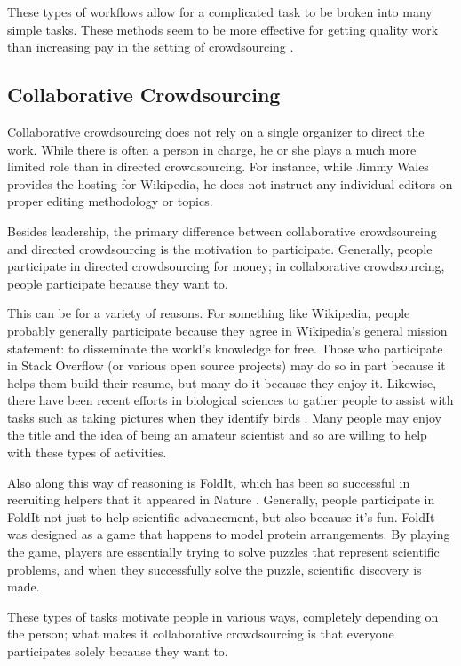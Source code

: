 These types of workflows allow for a complicated task to be broken into many simple tasks. These methods seem to be more effective for getting quality work than increasing pay in the setting of crowdsourcing \cite{crowdsourcing}.

\subsection{Collaborative Crowdsourcing}
Collaborative crowdsourcing does not rely on a single organizer to direct the work. While there is often a person in charge, he or she plays a much more limited role than in directed crowdsourcing. For instance, while Jimmy Wales provides the hosting for Wikipedia, he does not instruct any individual editors on proper editing methodology or topics.

Besides leadership, the primary difference between collaborative crowdsourcing and directed crowdsourcing is the motivation to participate. Generally, people participate in directed crowdsourcing for money; in collaborative crowdsourcing, people participate because they want to. 

This can be for a variety of reasons. For something like Wikipedia, people probably generally participate because they agree in Wikipedia's general mission statement: to disseminate the world's knowledge for free. Those who participate in Stack Overflow (or various open source projects) may do so in part because it helps them build their resume, but many do it because they enjoy it. Likewise, there have been recent efforts in biological sciences to gather people to assist with tasks such as taking pictures when they identify birds \cite{crowdsourcing}. Many people may enjoy the title and the idea of being an amateur scientist and so are willing to help with these types of activities.

Also along this way of reasoning is FoldIt, which has been so successful in recruiting helpers that it appeared in Nature \cite{foldit}. Generally, people participate in FoldIt not just to help scientific advancement, but also because it's fun. FoldIt was designed as a game that happens to model protein arrangements. By playing the game, players are essentially trying to solve puzzles that represent scientific problems, and when they successfully solve the puzzle, scientific discovery is made.

These types of tasks motivate people in various ways, completely depending on the person; what makes it collaborative crowdsourcing is that everyone participates solely because they want to.

